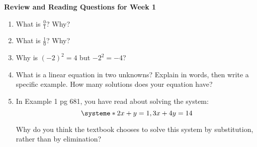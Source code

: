 \documentclass[12pt,dvipsnames]{article}
\begin{document}
\begin{center}

{\large{\bfseries{Review and Reading Questions for Week 1} }}
\end{center}
\begin{enumerate}[label=$\blacktriangleright$ {\bf  \arabic*:}]
	\item What is $\displaystyle \frac{0}{1}$? Why?
	\item What is $\displaystyle \frac{1}{0}$? Why?
	\item Why is $\displaystyle (-2)^2=4$ but $\displaystyle -2^2=-4$?
	\item What is a linear equation in two unknowns? Explain in words, then write a specific example. How many solutions does your equation have?
	\item In Example 1 pg 681, you have read about solving the system:
 \[
\systeme*{2x+y=1,3x+4y=14}
\]
	
	Why do you think the textbook chooses to solve this system by substitution, rather than by elimination?
	
	
	

\end{enumerate}
\end{document}
